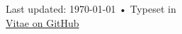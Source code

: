 \documentclass[10pt, letterpaper]{article}
\begin{document}


\vfill{}

\begin{center}
{\scriptsize  Last updated: \today\- •\- 
Typeset in \href{http://nitens.org/taraborelli/cvtex}{
\XeTeX }\\
\href{https://github.com/eghuang/cv/blob/master/cv.pdf}{Vitae on GitHub}}
\end{center}
\end{document}
